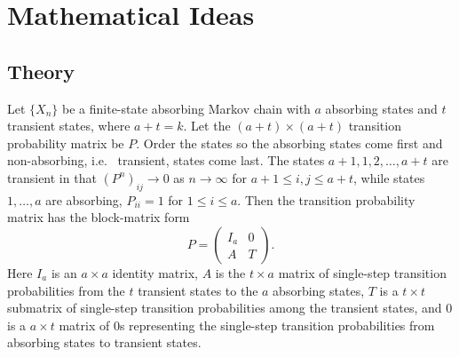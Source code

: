 \documentclass[12pt]{article}
\begin{document}
\section*{Mathematical Ideas}

\subsection*{Theory}

Let \( \{ X_n \} \) be a finite-state absorbing Markov chain with \( a \)
absorbing states and \( t \) transient states, where \( a + t = k \).
Let the \( (a + t) \times (a + t) \) transition probability matrix be \(
P \).  Order the states so the absorbing states come first and
non-absorbing, i.e.\ %
transient, states come last.  The states \( a+1, 1, 2, \dots, a+t \) are
transient in that \( \left( P^n \right)_{ij} \to 0 \) as \( n \to \infty
\) for \( a+1 \le i,j \le a+t \), while states \( 1, \dots, a \) are
absorbing, \( P_{ii} = 1 \) for \( 1 \le i \le a \).  Then the
transition probability matrix has the block-matrix form
\[
    P =
    \begin{pmatrix}
        I_a & 0 \\
        A & T
    \end{pmatrix}
    .
\] Here \( I_{a} \) is an \( a \times a \) identity matrix, \( A \) is
the \( t \times a \) matrix of single-step transition probabilities from
the \( t \) transient states to the \( a \) absorbing states, \( T \) is
a \( t \times t \) submatrix of single-step transition probabilities
among the transient states, and \( 0 \) is a \( a \times t \) matrix of \(
0 \)s representing the single-step transition probabilities from
absorbing states to transient states.
\end{document}
